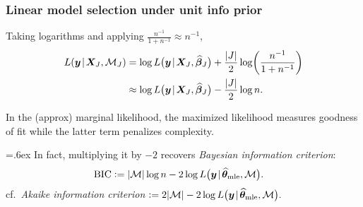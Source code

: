 \documentclass[18pt]{beamer}
\newcommand{\defineTightSpacing}{%
	\setlength{\abovedisplayskip}{.25\baselineskip}%
	\setlength{\belowdisplayskip}{.25\baselineskip}%
}
\newcommand{\given}{\mskip.7\thinmuskip | \mskip.7\thinmuskip}
\newcommand{\defeq}{\vcentcolon =} %
\newcommand{\mle}[1]{\widehat{#1}_{\textrm{mle}}}
\newcommand{\likelihood}{L}
\newcommand{\by}{\bm{y}}
\newcommand{\bX}{\bm{X}}
\newcommand{\bbeta}{\bm{\beta}}
\newcommand{\btheta}{\bm{\theta}}
\newcommand{\model}{\mathcal{M}}
\newcommand{\nonzeroCoefSet}{J}
\begin{document}
\begin{frame}
\frametitle{Linear model selection under unit info prior}
Taking logarithms and applying $\frac{n^{-1}}{1 + n^{-1}} \approx n^{-1}$,
\begin{equation*} \defineTightSpacing%
\begin{aligned}
\likelihood(\by \given \bX_\nonzeroCoefSet, \model_\nonzeroCoefSet)
	&= \log \likelihood\big( \by \given \bX_\nonzeroCoefSet, \widehat{\bbeta}_\nonzeroCoefSet \big) 
		+ \frac{| \nonzeroCoefSet |}{2} \log \! \left( \frac{n^{-1}}{1 + n^{-1}} \right) \\
	&\approx \log \likelihood\big( \by \given \bX_\nonzeroCoefSet, \widehat{\bbeta}_\nonzeroCoefSet \big) 
		- \frac{| \nonzeroCoefSet |}{2} \log n.
\end{aligned}
\end{equation*}

\pause
In the (approx) marginal likelihood, the maximized likelihood measures goodness of fit while the latter term penalizes complexity.

\pause
\smallskip
{\font=.6ex 
In fact, multiplying it by $- 2$ recovers \textit{Bayesian information criterion}:
}%
\begin{equation*} \defineTightSpacing%
\begin{aligned}
\textrm{BIC} 
	&\defeq | \model | \log n - 2 \log \likelihood\big( \by \given \mle{\btheta}, \model  \big).
\end{aligned}
\end{equation*}
cf.\ \textit{Akaike information criterion} $\defeq 2 | \model | - 2 \log \likelihood\big( \by \given \mle{\btheta}, \model  \big).$
\end{frame}
\end{document}
